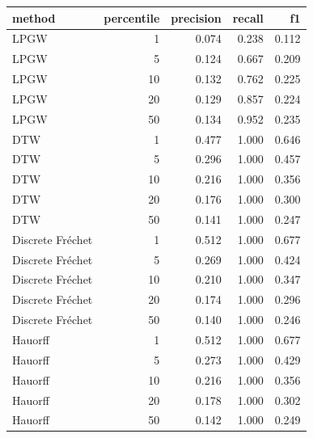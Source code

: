 \begin{tabular}{lrrrr}
\toprule
method & percentile & precision & recall & f1 \\
\midrule
LPGW & 1 & 0.074 & 0.238 & 0.112 \\
LPGW & 5 & 0.124 & 0.667 & 0.209 \\
LPGW & 10 & 0.132 & 0.762 & 0.225 \\
LPGW & 20 & 0.129 & 0.857 & 0.224 \\
LPGW & 50 & 0.134 & 0.952 & 0.235 \\
DTW & 1 & 0.477 & 1.000 & 0.646 \\
DTW & 5 & 0.296 & 1.000 & 0.457 \\
DTW & 10 & 0.216 & 1.000 & 0.356 \\
DTW & 20 & 0.176 & 1.000 & 0.300 \\
DTW & 50 & 0.141 & 1.000 & 0.247 \\
Discrete Fréchet & 1 & 0.512 & 1.000 & 0.677 \\
Discrete Fréchet & 5 & 0.269 & 1.000 & 0.424 \\
Discrete Fréchet & 10 & 0.210 & 1.000 & 0.347 \\
Discrete Fréchet & 20 & 0.174 & 1.000 & 0.296 \\
Discrete Fréchet & 50 & 0.140 & 1.000 & 0.246 \\
Hauorff & 1 & 0.512 & 1.000 & 0.677 \\
Hauorff & 5 & 0.273 & 1.000 & 0.429 \\
Hauorff & 10 & 0.216 & 1.000 & 0.356 \\
Hauorff & 20 & 0.178 & 1.000 & 0.302 \\
Hauorff & 50 & 0.142 & 1.000 & 0.249 \\
\bottomrule
\end{tabular}
